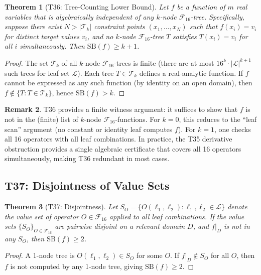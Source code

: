 \documentclass[12pt,a4paper]{article}
\newtheorem{theorem}{Theorem}[section]
\theoremstyle{definition}
\newtheorem{remark}[theorem]{Remark}
\newcommand{\F}{\mathcal{F}_{16}}
\newcommand{\SB}{\mathrm{SB}}
\begin{document}
\begin{theorem}[T36: Tree-Counting Lower Bound]
\label{thm:T36}
Let $f$ be a function of $m$ real variables that is algebraically
independent of any $k$-node $\F$-tree.  Specifically, suppose there exist
$N > |\mathcal{T}_k|$ constraint points $(x_1, \ldots, x_N)$ such that
$f(x_i) = v_i$ for distinct target values $v_i$, and no $k$-node $\F$-tree
$T$ satisfies $T(x_i) = v_i$ for all $i$ simultaneously.
Then $\SB(f) \ge k+1$.
\end{theorem}

\begin{proof}
The set $\mathcal{T}_k$ of all $k$-node $\F$-trees is finite (there are at
most $16^k \cdot |\mathcal{L}|^{k+1}$ such trees for leaf set $\mathcal{L}$).
Each tree $T \in \mathcal{T}_k$ defines a real-analytic function.  If $f$
cannot be expressed as any such function (by identity on an open domain),
then $f \notin \{T : T \in \mathcal{T}_k\}$, hence $\SB(f) > k$.
\end{proof}

\begin{remark}
T36 provides a finite witness argument: it suffices to show that $f$ is not
in the (finite) list of $k$-node $\F$-functions.  For $k=0$, this reduces
to the ``leaf scan'' argument (no constant or identity leaf computes $f$).
For $k=1$, one checks all 16 operators with all leaf combinations.
In practice, the T35 derivative obstruction provides a single algebraic
certificate that covers all 16 operators simultaneously, making T36 redundant
in most cases.
\end{remark}

\subsection{T37: Disjointness of Value Sets}

\begin{theorem}[T37: Disjointness]
\label{thm:T37}
Let $S_O = \{O(\ell_1,\ell_2) : \ell_1,\ell_2 \in \mathcal{L}\}$ denote the
value set of operator $O \in \F$ applied to all leaf combinations.  If the
value sets $\{S_O\}_{O\in\F}$ are pairwise disjoint on a relevant domain $D$,
and $f|_D$ is not in any $S_O$, then $\SB(f) \ge 2$.
\end{theorem}

\begin{proof}
A 1-node tree is $O(\ell_1,\ell_2) \in S_O$ for some $O$.  If $f|_D \notin S_O$
for all $O$, then $f$ is not computed by any 1-node tree, giving $\SB(f) \ge 2$.
\end{proof}
\end{document}
